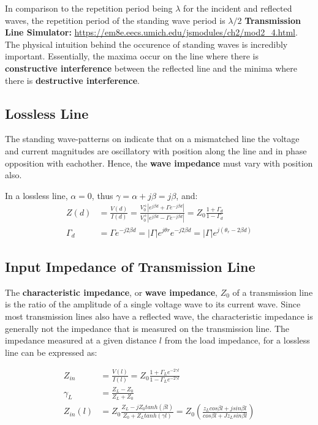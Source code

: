 \documentclass{book}
\begin{document}
In comparison to the repetition period being $\lambda$ for the incident and reflected waves, the repetition period of the standing wave period is $\lambda/2$
\textbf{Transmission Line Simulator:} \url{https://em8e.eecs.umich.edu/jsmodules/ch2/mod2_4.html}. The physical intuition behind the occurence of standing waves is incredibly important. Essentially, the maxima occur on the line where there is \textbf{constructive interference} between the reflected line and the minima where there is \textbf{destructive interference}.

\subsection{Lossless Line}


The standing wave-patterns on indicate that on a mismatched line the voltage and current magnitudes are oscillatory with position along the line and in phase opposition with eachother. Hence, the \textbf{wave impedance} must vary with position also.

In a lossless line, $\alpha=0$, thus $\gamma = \alpha + j \beta = j \beta$, and:
\begin{align*}
	Z(d) &= \frac{V(d)}{I(d)} = \frac{V_0^+ |e^{j\beta d} + \Gamma e^{-j\beta d}|}{V_0 ^+| e^{j\beta d} - \Gamma e^{-j\beta d}|} = Z_0 \frac{1+ \Gamma_d}{1 -\Gamma_d} \\
	\Gamma_d &= \Gamma e^{-j2\beta d} = |\Gamma| e^{j\theta r}e^{-j2\beta d} = |\Gamma| e^{j(\theta_r - 2\beta d)}
\end{align*}

\subsection{Input Impedance of Transmission Line}
The \textbf{characteristic impedance}, or \textbf{wave impedance}, $Z_0$ of a transmission line is the ratio of the amplitude of a single voltage wave to its current wave. Since most transmission lines also have a reflected wave, the characteristic impedance is generally not the impedance that is measured on the transmission line. \newline
The impedance measured at a given distance $l$ from the load impedance, for a lossless line can be expressed as:

\begin{align*}
		Z_{in} &= \frac{V(l)}{I(l)} = Z_0 \frac{1 + \Gamma_L e^{-2\gamma l}}{1 - \Gamma_L e^{-2 \gamma l}} \\
	\gamma_L &= \frac{Z_L -Z_0}{Z_L + Z_0} \\
	Z_{in}(l) &= Z_0 \frac{Z_L - jZ_0 tanh(\beta l)}{Z_0 + Z_L tanh(\gamma l)} = Z_0 (\frac{z_L cos \beta l + j sin \beta l}{cos \beta l + Jz_L sin \beta l})
\end{align*}
\end{document}
